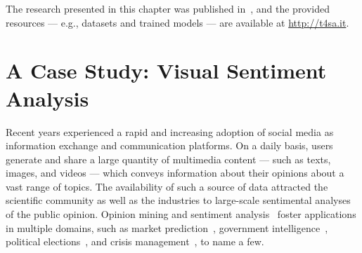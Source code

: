 The research presented in this chapter was published in~\cite{vadicamo2017cross}, and the provided resources --- e.g., datasets and trained models --- are available at \url{http://t4sa.it}.



\section{A Case Study: Visual Sentiment Analysis}
\label{sec:vsa:introduction}

Recent years experienced a rapid and increasing adoption of social media as information exchange and communication platforms.
On a daily basis, users generate and share a large quantity of multimedia content --- such as texts, images, and videos --- which conveys information about their opinions about a vast range of topics.
The availability of such a source of data attracted the scientific community as well as the industries to large-scale sentimental analyses of the public opinion.
Opinion mining and sentiment analysis~\cite{pang2008opinion} foster applications in multiple domains, such as market prediction~\cite{mishne2006predicting,asur2010predicting}, government intelligence~\cite{abbasi2007affect}, political elections~\cite{laver2003extracting,o2010tweets}, and crisis management~\cite{avvenuti2016impromptu,cresci2015linguistically}, to name a few.


